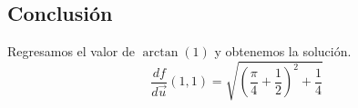     \subsection*{Conclusión}
        Regresamos el valor de $\arctan(1)$ y obtenemos la solución.
        \begin{equation*}
            \boxed{ \dfrac{d f}{d \vec{u}}(1,1) = \sqrt{\left( \frac{\pi}{4} + \frac{1}{2}\right)^2 + \frac{1}{4}} }
        \end{equation*}